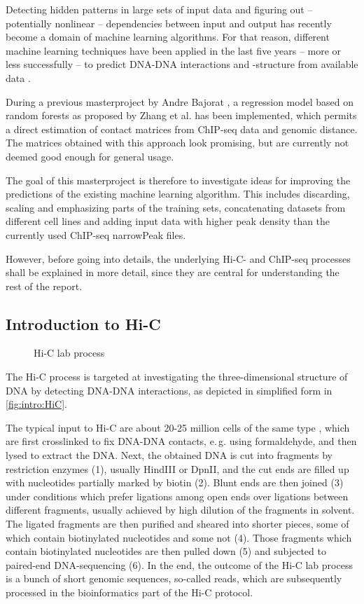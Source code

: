 Detecting hidden patterns in large sets of input data and figuring out -- potentially nonlinear -- dependencies between input and output
has recently become a domain of machine learning algorithms. 
For that reason, different machine learning techniques have been applied in the last five years -- more or less successfully -- 
to predict DNA-DNA interactions and -structure from available data \cite{Zhang2019,Pierro2017,Farre2018,Schwessinger2019,Li2019}.

During a previous masterproject by Andre Bajorat \cite{Bajorat2019}, 
a regression model based on random forests as proposed by Zhang et al. \cite{Zhang2019, Zhang2018}
has been implemented, which permits a direct estimation of contact matrices from ChIP-seq data and genomic distance.
The matrices obtained with this approach look promising, but are currently not deemed good enough for general usage.

The goal of this masterproject is therefore to investigate ideas for improving the predictions of the existing machine learning algorithm.
This includes discarding, scaling and emphasizing parts of the training sets, concatenating datasets from different cell lines 
and adding input data with higher peak density than the currently used ChIP-seq narrowPeak files.

However, before going into details, 
the underlying Hi-C- and ChIP-seq processes shall be explained in more detail,
since they are central for understanding the rest of the report.

\clearpage
\subsection{Introduction to Hi-C} \label{sec:intro:hic}
\begin{wrapfigure}[36]{r}{0.3\textwidth}
 \caption{Hi-C lab process}
 \label{fig:intro:HiC}
\end{wrapfigure}
The Hi-C process is targeted at investigating the three-dimensional structure of DNA
by detecting DNA-DNA interactions, 
as depicted in simplified form in \autoref{fig:intro:HiC}.

The typical input to Hi-C are about 20-25 million cells of the same type \cite{Berkum2010},
which are first crosslinked to fix DNA-DNA contacts, e.\,g. using formaldehyde, 
and then lysed to extract the DNA.
Next, the obtained DNA is cut into fragments by restriction enzymes (1),
usually HindIII or DpnII, 
and the cut ends are filled up with nucleotides partially marked by biotin (2).
Blunt ends are then joined (3) under conditions which prefer
ligations among open ends over ligations between different fragments,
usually achieved by high dilution of the fragments in solvent.
The ligated fragments are then purified and sheared into shorter pieces,
some of which contain biotinylated nucleotides and some not (4).
Those fragments which contain biotinylated nucleotides 
are then pulled down (5) and subjected to paired-end DNA-sequencing (6).
In the end, the outcome of the Hi-C lab process is a bunch of short genomic sequences, so-called reads,
which are subsequently processed in the bioinformatics part of the Hi-C protocol.

